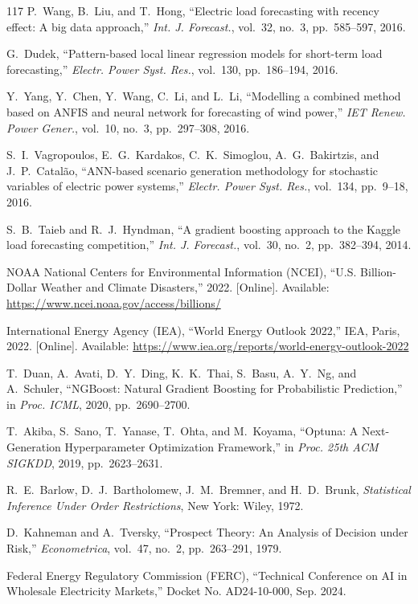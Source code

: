 \documentclass[12pt,a4paper]{article}
\begin{document}
\begin{thebibliography}{117}
 P.~Wang, B.~Liu, and T.~Hong, ``Electric load forecasting with recency effect: A big data approach,'' \textit{Int. J. Forecast.}, vol.~32, no.~3, pp.~585--597, 2016.

 G.~Dudek, ``Pattern-based local linear regression models for short-term load forecasting,'' \textit{Electr. Power Syst. Res.}, vol.~130, pp.~186--194, 2016.

 Y.~Yang, Y.~Chen, Y.~Wang, C.~Li, and L.~Li, ``Modelling a combined method based on ANFIS and neural network for forecasting of wind power,'' \textit{IET Renew. Power Gener.}, vol.~10, no.~3, pp.~297--308, 2016.

 S.~I.~Vagropoulos, E.~G.~Kardakos, C.~K.~Simoglou, A.~G.~Bakirtzis, and J.~P.~Catal\~{a}o, ``ANN-based scenario generation methodology for stochastic variables of electric power systems,'' \textit{Electr. Power Syst. Res.}, vol.~134, pp.~9--18, 2016.

 S.~B.~Taieb and R.~J.~Hyndman, ``A gradient boosting approach to the Kaggle load forecasting competition,'' \textit{Int. J. Forecast.}, vol.~30, no.~2, pp.~382--394, 2014.

 NOAA National Centers for Environmental Information (NCEI), ``U.S. Billion-Dollar Weather and Climate Disasters,'' 2022. [Online]. Available: \url{https://www.ncei.noaa.gov/access/billions/}

 International Energy Agency (IEA), ``World Energy Outlook 2022,'' IEA, Paris, 2022. [Online]. Available: \url{https://www.iea.org/reports/world-energy-outlook-2022}

 T.~Duan, A.~Avati, D.~Y.~Ding, K.~K.~Thai, S.~Basu, A.~Y.~Ng, and A.~Schuler, ``NGBoost: Natural Gradient Boosting for Probabilistic Prediction,'' in \textit{Proc. ICML}, 2020, pp.~2690--2700.

 T.~Akiba, S.~Sano, T.~Yanase, T.~Ohta, and M.~Koyama, ``Optuna: A Next-Generation Hyperparameter Optimization Framework,'' in \textit{Proc. 25th ACM SIGKDD}, 2019, pp.~2623--2631.

 R.~E.~Barlow, D.~J.~Bartholomew, J.~M.~Bremner, and H.~D.~Brunk, \textit{Statistical Inference Under Order Restrictions}, New York: Wiley, 1972.

 D.~Kahneman and A.~Tversky, ``Prospect Theory: An Analysis of Decision under Risk,'' \textit{Econometrica}, vol.~47, no.~2, pp.~263--291, 1979.

 Federal Energy Regulatory Commission (FERC), ``Technical Conference on AI in Wholesale Electricity Markets,'' Docket No. AD24-10-000, Sep. 2024.

\end{thebibliography}
\end{document}
